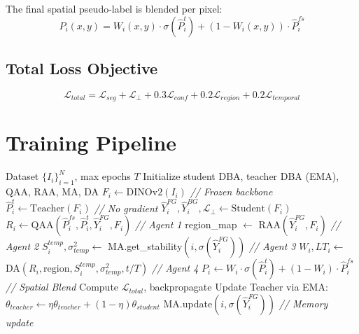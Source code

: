 \documentclass[journal,twoside,web]{IEEEtran}
\newcommand{\methodname}{UCOD-ADF}
\begin{document}
The final spatial pseudo-label is blended per pixel:
\begin{equation}
P_i(x,y) = W_i(x,y) \cdot \sigma(\hat{P}_i^t) + (1 - W_i(x,y)) \cdot \hat{P}_i^{fs}
\end{equation}

\subsection{Total Loss Objective}

\begin{equation}
\mathcal{L}_{total} = \mathcal{L}_{seg} + \mathcal{L}_\bot + 0.3 \mathcal{L}_{conf} + 0.2 \mathcal{L}_{region} + 0.2 \mathcal{L}_{temporal}
\end{equation}

\section{Training Pipeline}
\label{sec:pipeline}

\begin{algorithm}[h]
\caption{\methodname{} Training Procedure}
\label{alg:training}
\begin{algorithmic}[1]
\REQUIRE Dataset $\{I_i\}_{i=1}^N$, max epochs $T$
\STATE Initialize student DBA, teacher DBA (EMA), QAA, RAA, MA, DA
        \STATE $F_i \leftarrow \text{DINOv2}(I_i)$ \hfill \textit{// Frozen backbone}
        \STATE $\hat{P}_i^t \leftarrow \text{Teacher}(F_i)$ \hfill \textit{// No gradient}
        \STATE $\hat{Y}_i^{FG}, \hat{Y}_i^{BG}, \mathcal{L}_\bot \leftarrow \text{Student}(F_i)$
        \STATE $R_i \leftarrow \text{QAA}(\hat{P}_i^{fs}, \hat{P}_i^t, \hat{Y}_i^{FG}, F_i)$ \hfill \textit{// Agent 1}
        \STATE region\_map $\leftarrow$ RAA$(\hat{Y}_i^{FG}, F_i)$ \hfill \textit{// Agent 2}
        \STATE $S_i^{temp}, \sigma^2_{temp} \leftarrow$ MA.get\_stability$(i, \sigma(\hat{Y}_i^{FG}))$ \hfill \textit{// Agent 3}
        \STATE $W_i, LT_i \leftarrow$ DA$(R_i, \text{region}, S_i^{temp}, \sigma^2_{temp}, t/T)$ \hfill \textit{// Agent 4}
        \STATE $P_i \leftarrow W_i \cdot \sigma(\hat{P}_i^t) + (1-W_i) \cdot \hat{P}_i^{fs}$ \hfill \textit{// Spatial Blend}
        \STATE Compute $\mathcal{L}_{total}$, backpropagate
        \STATE Update Teacher via EMA: $\theta_{teacher} \leftarrow \eta \theta_{teacher} + (1-\eta) \theta_{student}$
        \STATE MA.update$(i, \sigma(\hat{Y}_i^{FG}))$ \hfill \textit{// Memory update}
    \ENDFOR
\ENDFOR
\end{algorithmic}
\end{algorithm}
\end{document}
